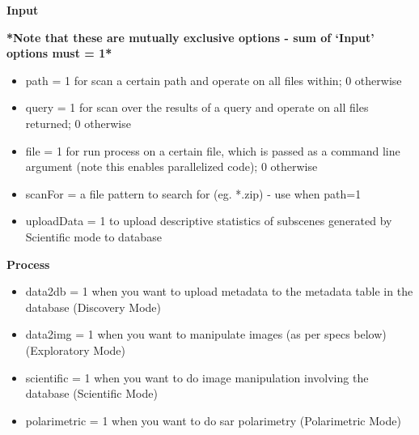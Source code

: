 \documentclass[letterpaper,10pt,openany,oneside]{sphinxmanual}
\begin{document}
\textbf{Input}

\textbf{*Note that these are mutually exclusive options - sum of `Input'
options must = 1*}
\begin{itemize}
\item {} 
path = 1 for scan a certain path and operate on all files within; 0
otherwise

\item {} 
query = 1 for scan over the results of a query and operate on all
files returned; 0 otherwise

\item {} 
file = 1 for run process on a certain file, which is passed as a
command line argument (note this enables parallelized code); 0
otherwise

\item {} 
scanFor = a file pattern to search for (eg. *.zip) - use when path=1

\item {} 
uploadData = 1 to upload descriptive statistics of subscenes
generated by Scientific mode to database

\end{itemize}

\textbf{Process}
\begin{itemize}
\item {} 
data2db = 1 when you want to upload metadata to the metadata table in
the database (Discovery Mode)

\item {} 
data2img = 1 when you want to manipulate images (as per specs below)
(Exploratory Mode)

\item {} 
scientific = 1 when you want to do image manipulation involving the
database (Scientific Mode)

\item {} 
polarimetric = 1 when you want to do sar polarimetry (Polarimetric
Mode)

\end{itemize}
\end{document}
